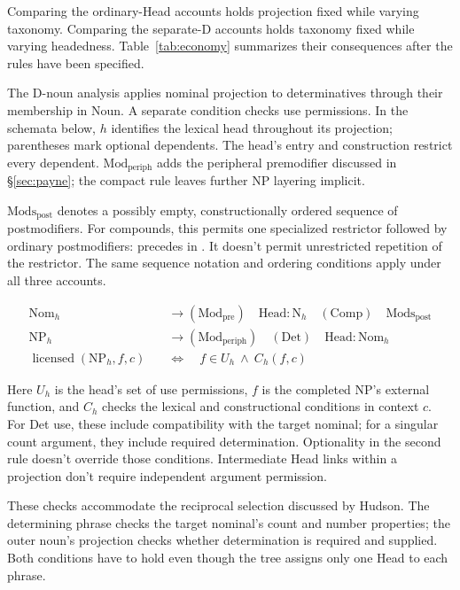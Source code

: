 \documentclass[12pt]{article}
\begin{document}
Comparing the ordinary-Head accounts holds projection fixed while varying taxonomy. Comparing the separate-D accounts holds taxonomy fixed while varying headedness. Table~\ref{tab:economy} summarizes their consequences after the rules have been specified.

The D-noun analysis applies nominal projection to determinatives through their membership in Noun. A separate condition checks use permissions. In the schemata below, $h$ identifies the lexical head throughout its projection; parentheses mark optional dependents. The head's entry and construction restrict every dependent. $\mathrm{Mod}_{\mathrm{periph}}$ adds the peripheral premodifier discussed in §\ref{sec:payne}; the compact rule leaves further NP layering implicit.

$\mathrm{Mods}_{\mathrm{post}}$ denotes a possibly empty, constructionally ordered sequence of postmodifiers. For compounds, this permits one specialized restrictor followed by ordinary postmodifiers:  precedes  in . It doesn't permit unrestricted repetition of the restrictor. The same sequence notation and ordering conditions apply under all three accounts.

\[
\begin{aligned}
\mathrm{Nom}_{h} &\to (\mathrm{Mod}_{\mathrm{pre}})\quad \mathrm{Head}:\mathrm{N}_{h}\quad (\mathrm{Comp})\quad \mathrm{Mods}_{\mathrm{post}} \\
\mathrm{NP}_{h} &\to (\mathrm{Mod}_{\mathrm{periph}})\quad (\mathrm{Det})\quad \mathrm{Head}:\mathrm{Nom}_{h} \\
\operatorname{licensed}(\mathrm{NP}_{h},f,c)\quad &\Longleftrightarrow\quad f\in U_h\ \land\ C_h(f,c)
\end{aligned}
\]

Here $U_h$ is the head's set of use permissions, $f$ is the completed NP's external function, and $C_h$ checks the lexical and constructional conditions in context $c$. For Det use, these include compatibility with the target nominal; for a singular count argument, they include required determination. Optionality in the second rule doesn't override those conditions. Intermediate Head links within a projection don't require independent argument permission.

These checks accommodate the reciprocal selection discussed by Hudson. The determining phrase checks the target nominal's count and number properties; the outer noun's projection checks whether determination is required and supplied. Both conditions have to hold even though the tree assigns only one Head to each phrase.
\end{document}

